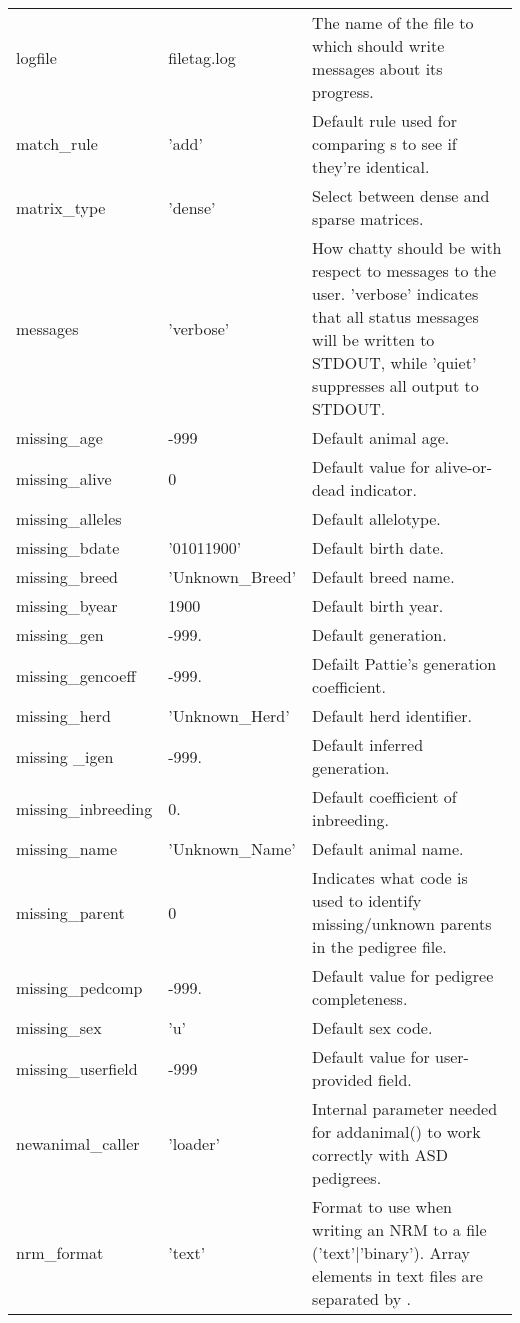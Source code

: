 \begin{center}
\begin{xtabular}{l|l|p{4in}}
	logfile          & filetag.log  & The name of the file to which \PyPedal{} should write messages about its progress. \\
	match\_rule & 'add' & Default rule used for comparing s to see if they're identical. \\
	matrix\_type	 & 'dense'	& Select between dense and sparse matrices.\\
	messages         & 'verbose'    & How chatty \PyPedal{} should be with respect to messages to the user.  'verbose' indicates that all status messages will be written to STDOUT, while 'quiet' suppresses all output to STDOUT. \\
	missing\_age & -999 & Default animal age. \\
	missing\_alive & 0 & Default value for alive-or-dead indicator. \\
	missing\_alleles & \code{[`'],[`']} & Default allelotype. \\
	missing\_bdate    & '01011900'   & Default birth date. \\
	missing\_breed    & 'Unknown\_Breed'    & Default breed name. \\
	missing\_byear    & 1900         & Default birth year. \\
	missing\_gen & -999. & Default generation. \\
	missing\_gencoeff & -999. & Defailt Pattie's generation coefficient. \\
	missing\_herd	 & 'Unknown\_Herd'	& Default herd identifier. \\
	missing \_igen & -999. & Default inferred generation. \\
	missing\_inbreeding & 0. & Default coefficient of inbreeding. \\
	missing\_name     & 'Unknown\_Name'    & Default animal name. \\
	missing\_parent  & 0            & Indicates what code is used to identify missing/unknown parents in the pedigree file. \\
	missing\_pedcomp & -999. & Default value for pedigree completeness. \\
	missing\_sex	 & 'u'		& Default sex code. \\
	missing\_userfield & -999 & Default value for user-provided field. \\
	newanimal\_caller  & 'loader'   & Internal parameter needed for addanimal() to work correctly with ASD pedigrees. \\
	nrm\_format      & 'text'       & Format to use when writing an NRM to a file ('text'|'binary'). Array elements in text files are separated by .\\

\end{xtabular}
\end{center}
